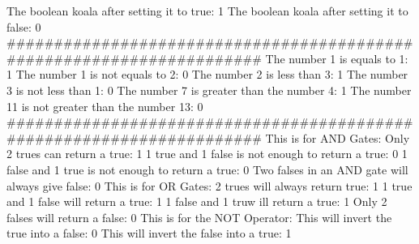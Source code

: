 The boolean koala after setting it to true: 1
The boolean koala after setting it to false: 0
######################################################################
The number 1 is equals to 1: 1
The number 1 is not equals to 2: 0
The number 2 is less than 3: 1
The number 3 is not less than 1: 0
The number 7 is greater than the number 4: 1
The number 11 is not greater than the number 13: 0
######################################################################
This is for AND Gates:
Only 2 trues can return a true: 1
1 true and 1 false is not enough to return a true: 0
1 false and 1 true is not enough to return a true: 0
Two falses in an AND gate will always give false: 0
This is for OR Gates:
2 trues will always return true: 1
1 true and 1 false will return a true: 1
1 false and 1 truw ill return a true: 1
Only 2 falses will return a false: 0
This is for the NOT Operator:
This will invert the true into a false: 0
This will invert the false into a true: 1
